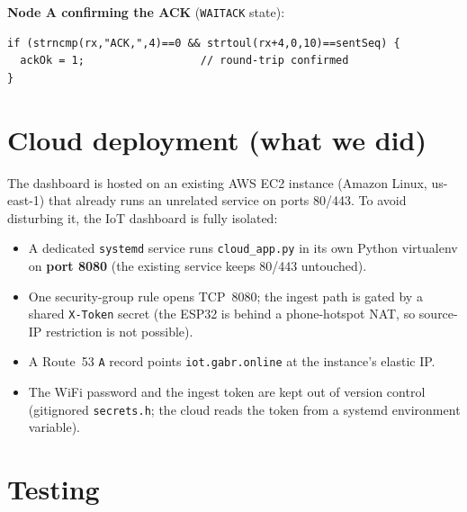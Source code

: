 \documentclass[11pt,a4paper]{article}
\begin{document}
\textbf{Node A confirming the ACK} (\texttt{WAITACK} state):
\begin{lstlisting}
if (strncmp(rx,"ACK,",4)==0 && strtoul(rx+4,0,10)==sentSeq) {
  ackOk = 1;                  // round-trip confirmed
}
\end{lstlisting}

\section{Cloud deployment (what we did)}

The dashboard is hosted on an existing AWS EC2 instance (Amazon Linux,
us-east-1) that already runs an unrelated service on ports 80/443. To
avoid disturbing it, the IoT dashboard is fully isolated:

\begin{itemize}
\item A dedicated \texttt{systemd} service runs \texttt{cloud\_app.py}
in its own Python virtualenv on \textbf{port 8080} (the existing service
keeps 80/443 untouched).
\item One security-group rule opens TCP~8080; the ingest path is gated
by a shared \texttt{X-Token} secret (the ESP32 is behind a phone-hotspot
NAT, so source-IP restriction is not possible).
\item A Route~53 \texttt{A} record points \texttt{iot.gabr.online} at
the instance's elastic IP.
\item The WiFi password and the ingest token are kept out of version
control (gitignored \texttt{secrets.h}; the cloud reads the token from a
systemd environment variable).
\end{itemize}

\section{Testing}
\end{document}
